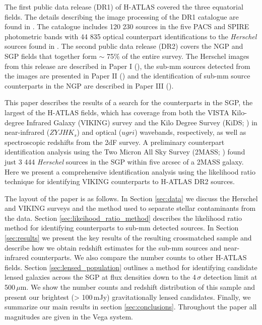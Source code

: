 \documentclass[fleqn,usenatbib]{mnras}
\begin{document}
The first public data release (DR1) of H-ATLAS covered the three equatorial fields. The details describing the image processing of the DR1 catalogue are found in \citealt{Valiante_2016}. The catalogue includes 120 230 sources in the five PACS and SPIRE photometric bands with 44 835 optical counterpart identifications to the \textit{Herschel} sources found in \citealt{Bourne_2016}. The second public data release (DR2) covers the NGP and SGP fields that together form $\sim$ 75\% of the entire survey. The Herschel images from this release are described in Paper I (\citealt{Smith_2017}), the sub-mm sources detected from the images are presented in Paper II (\citealt{Maddox_2018}) and the identification of sub-mm source counterparts in the NGP are described in Paper III (\citealt{Furlanetto_2018}). 

This paper describes the results of a search for the counterparts in the SGP, the largest of the H-ATLAS fields, which has coverage from both the VISTA Kilo-degree Infrared Galaxy (VIKING) survey and the Kilo Degree Survey (KiDS; \citealt{deJong_2013}) in near-infrared ($ZYJHK_s$) and optical ($ugri$) wavebands, respectively, as well as spectroscopic redshifts from the 2dF survey. A preliminary counterpart identification analysis using the Two Micron All Sky Survey (2MASS; \citealt{Skrutskie_2006}) found just 3 444 \textit{Herschel} sources in the SGP within five arcsec of a 2MASS galaxy. Here we present a comprehensive identification analysis using the likelihood ratio technique for identifying VIKING counterparts to H-ATLAS DR2 sources.

The layout of the paper is as follows. In Section \ref{sec:data} we discuss the Herschel and VIKING surveys and the method used to separate stellar contaminants from the data. Section \ref{sec:likeihood_ratio_method} describes the likelihood ratio method for identifying counterparts to sub-mm detected sources. In Section \ref{sec:results} we present the key results of the resulting crossmatched sample and describe how we obtain redshift estimates for the sub-mm sources and near-infrared counterparts. We also compare the number counts to other H-ATLAS fields. Section \ref{sec:lensed_population} outlines a method for identifying candidate lensed galaxies across the SGP at flux densities down to the 4\,$\sigma$ detection limit at 500\,$\mu$m. We show the number counts and redshift distribution of this sample and present our brightest (> 100\,mJy) gravitationally lensed candidates. Finally, we summarize our main results in section \ref{sec:conclusions}. Throughout the paper all magnitudes are given in the Vega system.
\end{document}
